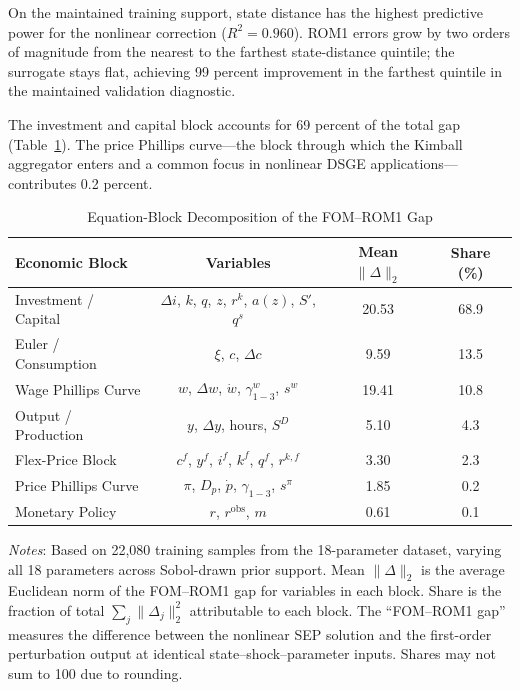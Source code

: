 \documentclass[12pt]{article}
\theoremstyle{plain}
\theoremstyle{definition}
\theoremstyle{remark}
\newcommand{\tablenotes}[1]{%
  \par\vspace{0.5em}%
  \noindent\begin{minipage}{\textwidth}%
  \raggedright\footnotesize #1%
  \end{minipage}\par%
}
\begin{document}
On the maintained training support, state distance has the highest predictive power for the nonlinear correction ($R^2 = 0.960$). ROM1 errors grow by two orders of magnitude from the nearest to the farthest state-distance quintile; the surrogate stays flat, achieving 99 percent improvement in the farthest quintile in the maintained validation diagnostic.

The investment and capital block accounts for 69 percent of the total gap (Table~\ref{tab:equation_block}). The price Phillips curve---the block through which the Kimball aggregator enters and a common focus in nonlinear DSGE applications---contributes 0.2 percent.

\begin{table}[htbp]
\centering
\caption{Equation-Block Decomposition of the FOM--ROM1 Gap}
\label{tab:equation_block}
\begin{tabular}{lccc}
\toprule
Economic Block & Variables & Mean $\|\Delta\|_2$ & Share (\%) \\
\midrule
Investment / Capital & $\Delta i$, $k$, $q$, $z$, $r^k$, $a(z)$, $S'$, $q^s$ & 20.53 & 68.9 \\
Euler / Consumption & $\xi$, $c$, $\Delta c$ & 9.59 & 13.5 \\
Wage Phillips Curve & $w$, $\Delta w$, $\dot{w}$, $\gamma^w_{1{-}3}$, $s^w$ & 19.41 & 10.8 \\
Output / Production & $y$, $\Delta y$, hours, $S^D$ & 5.10 & 4.3 \\
Flex-Price Block & $c^f$, $y^f$, $i^f$, $k^f$, $q^f$, $r^{k,f}$ & 3.30 & 2.3 \\
Price Phillips Curve & $\pi$, $D_p$, $\dot{p}$, $\gamma_{1{-}3}$, $s^\pi$ & 1.85 & 0.2 \\
Monetary Policy & $r$, $r^{\text{obs}}$, $m$ & 0.61 & 0.1 \\
\bottomrule
\end{tabular}
\tablenotes{\textit{Notes}: Based on 22,080 training samples from the 18-parameter dataset, varying all 18 parameters across Sobol-drawn prior support. Mean $\|\Delta\|_2$ is the average Euclidean norm of the FOM--ROM1 gap for variables in each block. Share is the fraction of total $\sum_j \|\Delta_j\|_2^2$ attributable to each block. The ``FOM--ROM1 gap'' measures the difference between the nonlinear SEP solution and the first-order perturbation output at identical state--shock--parameter inputs. Shares may not sum to 100 due to rounding.}
\end{table}
\end{document}
